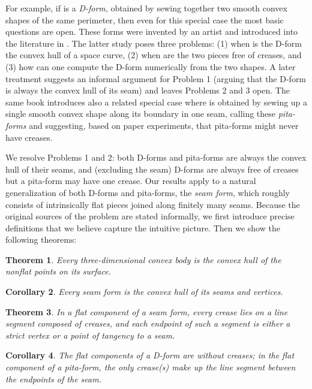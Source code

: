 \documentclass{article}
\newtheorem{theorem}{Theorem}
\newtheorem{corollary}[theorem]{Corollary}
\begin{document}
For example, if  is a \emph{D-form}, obtained by sewing together
two smooth convex shapes of the same perimeter, then even for this
special case the most basic questions are open.  These forms were
invented by an artist \cite{Wills} and introduced into the literature
in \cite{PW}.  The latter study poses three
problems: (1) when is the D-form the convex hull of a space curve, (2)
when are the two pieces free of creases, and (3) how can one compute the
D-form numerically from the two shapes.  A later treatment
\cite{GFALOP} suggests an informal argument for Problem 1 (arguing
that the D-form is always the convex hull of its seam) and leaves
Problems 2 and 3 open.  The same book \cite{GFALOP} introduces also a related
special case where  is obtained by sewing up a single smooth convex
shape along its boundary in one seam, calling these \emph{pita-forms}
and suggesting, based on paper experiments, that pita-forms might never
have creases.

We resolve Problems 1 and 2: both D-forms and pita-forms are always
the convex hull of their seams, and (excluding the seam) D-forms are
always free of creases but a pita-form may have one crease.  Our
results apply to a natural generalization of both D-forms and
pita-forms, the \emph{seam form}, which
roughly consists of intrinsically flat pieces joined along finitely many
seams.  Because the original sources of the problem are stated
informally, we first introduce precise definitions that we believe
capture the intuitive picture.  Then we show the following theorems:

\begin{theorem}\label{t:convex-hull-general}
  Every three-dimensional convex body is the convex hull of the
  nonflat points on its surface.
\end{theorem}

\begin{corollary}\label{c:convex-hull-seam-form}
  Every seam form is the convex hull of its seams and vertices.
\end{corollary}

\begin{theorem}\label{t:no-creases-seam-form}
  In a flat component of a seam form, every crease lies on a line
  segment composed of creases, and each endpoint of such a segment is
  either a strict vertex or a point of tangency to a seam.
\end{theorem}

\begin{corollary}\label{c:no-creases-d-form}
  The flat components of a D-form are without creases; in the flat
  component of a pita-form, the only crease(s) make up the line
  segment between the endpoints of the seam.
\end{corollary}
\end{document}
